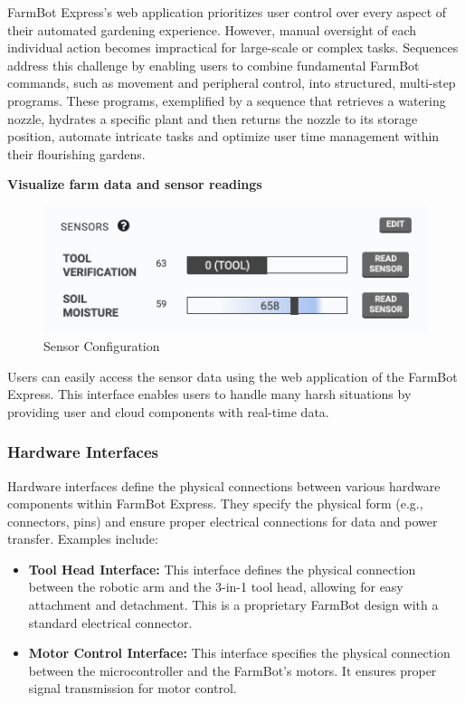 \begin{itemize}
    
    FarmBot Express's web application prioritizes user control over every aspect of their automated gardening experience. However, manual oversight of each individual action becomes impractical for large-scale or complex tasks. Sequences address this challenge by enabling users to combine fundamental FarmBot commands, such as movement and peripheral control, into structured, multi-step programs. These programs, exemplified by a sequence that retrieves a watering nozzle, hydrates a specific plant and then returns the nozzle to its storage position, automate intricate tasks and optimize user time management within their flourishing gardens.

    \textbf{Visualize farm data and sensor readings}
    
    \begin{figure}[H]
        \centering
        \includegraphics[width=0.6\linewidth]{Figures/ui_sensors.png}
        \caption{Sensor Configuration}
        \label{fig:ui_sensor}
    \end{figure}

    Users can easily access the sensor data using the web application of the FarmBot Express. This interface enables users to handle many harsh situations by providing user and cloud components with real-time data. 
    
\end{itemize}

\subsubsection{Hardware Interfaces}
Hardware interfaces define the physical connections between various hardware components within FarmBot Express. They specify the physical form (e.g., connectors, pins) and ensure proper electrical connections for data and power transfer. Examples include:

\begin{itemize}
    \item \textbf{Tool Head Interface:} This interface defines the physical connection between the robotic arm and the 3-in-1 tool head, allowing for easy attachment and detachment. This is a proprietary FarmBot design with a standard electrical connector.
    \item \textbf{Motor Control Interface:} This interface specifies the physical connection between the microcontroller and the FarmBot's motors. It ensures proper signal transmission for motor control.
\end{itemize}

